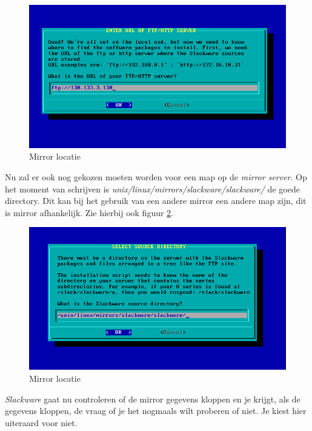 \begin{figure}[H]
  \begin{center}
    \includegraphics[scale=0.5]{images/05_mirror_location}
  \end{center}
  \caption{Mirror locatie}
  \label{fig:mirror}
\end{figure}

Nu zal er ook nog gekozen moeten worden voor een map op de \emph{mirror server}. Op het moment van schrijven is \emph{unix/linux/mirrors/slackware/slackware/} de goede directory. Dit kan bij het gebruik van een andere mirror een andere map zijn, dit is mirror afhankelijk. Zie hierbij ook figuur \ref{fig:mirror2}.

\begin{figure}[H]
  \begin{center}
    \includegraphics[scale=0.5]{images/06_mirror_location_2}
  \end{center}
  \caption{Mirror locatie}
  \label{fig:mirror2}
\end{figure}
\emph{Slackware} gaat nu controleren of de mirror gegevens kloppen en je krijgt, als de gegevens kloppen, de vraag of je het nogmaals wilt proberen of niet. Je kiest hier uiteraard voor niet. 

